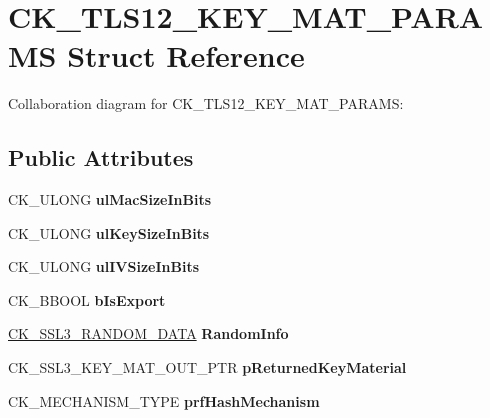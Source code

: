 \hypertarget{struct_c_k___t_l_s12___k_e_y___m_a_t___p_a_r_a_m_s}{}\section{C\+K\+\_\+\+T\+L\+S12\+\_\+\+K\+E\+Y\+\_\+\+M\+A\+T\+\_\+\+P\+A\+R\+A\+MS Struct Reference}
\label{struct_c_k___t_l_s12___k_e_y___m_a_t___p_a_r_a_m_s}


Collaboration diagram for C\+K\+\_\+\+T\+L\+S12\+\_\+\+K\+E\+Y\+\_\+\+M\+A\+T\+\_\+\+P\+A\+R\+A\+MS\+:
\subsection*{Public Attributes}
\begin{DoxyCompactItemize}
\item 
\mbox{\label{struct_c_k___t_l_s12___k_e_y___m_a_t___p_a_r_a_m_s_ab5fba4573464b3d1c94bc8c54be4f2ce}} 
C\+K\+\_\+\+U\+L\+O\+NG {\bfseries ul\+Mac\+Size\+In\+Bits}
\item 
\mbox{\label{struct_c_k___t_l_s12___k_e_y___m_a_t___p_a_r_a_m_s_a721a1d07131ecbec8610be37b6a5d6bc}} 
C\+K\+\_\+\+U\+L\+O\+NG {\bfseries ul\+Key\+Size\+In\+Bits}
\item 
\mbox{\label{struct_c_k___t_l_s12___k_e_y___m_a_t___p_a_r_a_m_s_a7b056ccf74aa1baa1d9f3fb2ef201f66}} 
C\+K\+\_\+\+U\+L\+O\+NG {\bfseries ul\+I\+V\+Size\+In\+Bits}
\item 
\mbox{\label{struct_c_k___t_l_s12___k_e_y___m_a_t___p_a_r_a_m_s_ac894353a02b1c63d4de5f1efa1b95f73}} 
C\+K\+\_\+\+B\+B\+O\+OL {\bfseries b\+Is\+Export}
\item 
\mbox{\label{struct_c_k___t_l_s12___k_e_y___m_a_t___p_a_r_a_m_s_aa4eccdc906985cd83579e707a48f62c0}} 
\mbox{\hyperlink{struct_c_k___s_s_l3___r_a_n_d_o_m___d_a_t_a}{C\+K\+\_\+\+S\+S\+L3\+\_\+\+R\+A\+N\+D\+O\+M\+\_\+\+D\+A\+TA}} {\bfseries Random\+Info}
\item 
\mbox{\label{struct_c_k___t_l_s12___k_e_y___m_a_t___p_a_r_a_m_s_a191bbf52b667fa049a645bb4e7443320}} 
C\+K\+\_\+\+S\+S\+L3\+\_\+\+K\+E\+Y\+\_\+\+M\+A\+T\+\_\+\+O\+U\+T\+\_\+\+P\+TR {\bfseries p\+Returned\+Key\+Material}
\item 
\mbox{\label{struct_c_k___t_l_s12___k_e_y___m_a_t___p_a_r_a_m_s_a74161cfccbd5f17886cec64ec28d592d}} 
C\+K\+\_\+\+M\+E\+C\+H\+A\+N\+I\+S\+M\+\_\+\+T\+Y\+PE {\bfseries prf\+Hash\+Mechanism}
\end{DoxyCompactItemize}


